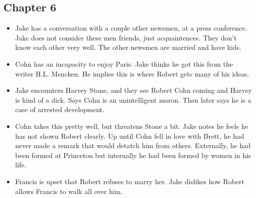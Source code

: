 \documentclass[11pt]{article}
\begin{document}
\subsection{Chapter 6}
\begin{itemize}
	\item Jake has a conversation with a couple other newsmen, at a press 
		conference.  Jake does not consider these men friends, just 
		acquaintences.  They don't know each other very well.  The other 
		newsmen are married and have kids.
	\item Cohn has an incapacity to enjoy Paris.  Jake thinks he got this from 
		the writer H.L. Mencken.  He implies this is where Robert gets many of 
		his ideas. 
	\item Jake encounters Harvey Stone, and they see Robert Cohn coming and 
		Harvey is kind of a dick.  Says Cohn is an unintelligent moron.  Then 
		later says he is a case of arrested development.
	\item Cohn takes this pretty well, but threatens Stone a bit.  Jake notes 
		he feels he has not shown Robert clearly.  Up until Cohn fell in love 
		with Brett, he had never made a remark that would detatch him from 
		others.  Externally, he had been formed at Princeton but internally he 
		had been formed by women in his life.
	\item Francis is upset that Robert refuses to marry her.  Jake dislikes 
		how Robert allows Francis to walk all over him.
	\end{itemize}
\end{document}
